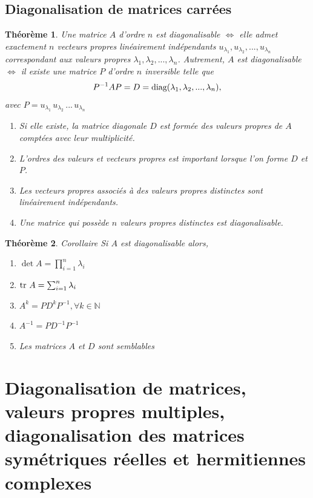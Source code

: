 \documentclass{article}[french, babel]
\newtheorem{mythm}{Théorème}
\let\stdsection\section
\renewcommand\section{\newpage\stdsection}
\begin{document}
	\subsection{Diagonalisation de matrices carrées}
		\begin{mythm}
			Une matrice $A$ d'ordre $n$ est diagonalisable $\Longleftrightarrow$ elle admet exactement $n$ vecteurs propres linéairement indépendants $u_{\lambda_1},u_{\lambda_2},...,u_{\lambda_n}$ correspondant aux valeurs propres $\lambda_1,\lambda_2,...,\lambda_n$. Autrement, $A$ est diagonalisable $\Longleftrightarrow$ il existe une matrice $P$ d'ordre $n$ inversible telle que \[P^{-1}AP=D=\text{\normalfont{diag}} (\lambda_1,\lambda_2,...,\lambda_n),\] avec $P=u_{\lambda_1}\, u_{\lambda_2}\, ...\, u_{\lambda_n}$
			\begin{enumerate}
				\item Si elle existe, la matrice diagonale $D$ est formée des valeurs propres de $A$ comptées avec leur multiplicité.
				\item L'ordres des valeurs et vecteurs propres est important lorsque l'on forme $D$ et $P$.
				\item Les vecteurs propres associés à des valeurs propres distinctes sont linéairement indépendants.
				\item  Une matrice qui possède $n$ valeurs propres distinctes est diagonalisable.
			\end{enumerate}
		\end{mythm}
	\begin{mythm}{Corollaire}
		Si $A$ est diagonalisable alors,
		\begin{enumerate}
			\item $\det A=\prod_{i=1}^{n}\lambda_i$
			\item $\text{\normalfont{tr}}~A=\sum_{i=1}^{n}\lambda_i$
			\item $A^k=PD^kP^{-1},\forall k\in\mathbb{N}$
			\item $A^{-1}=PD^{-1}P^{-1}$
			\item Les matrices $A$ et $D$ sont semblables
		\end{enumerate}
	\end{mythm}
\section{Diagonalisation de matrices, valeurs propres multiples, diagonalisation des matrices symétriques réelles et hermitiennes complexes}
\end{document}

